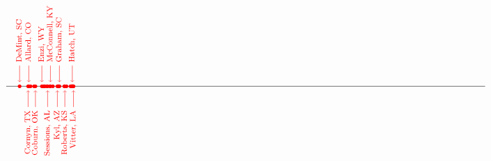 \begin{equation*}
  \def\dataD#1#2#3#4#5#6#7{\fill[dem](#5,0) circle (0.09);}
  \def\dataR#1#2#3#4#5#6#7{\fill[rep](#5,0) circle (0.09);}
  \def\dataDx#1#2#3#4#5#6#7{\fill[dem](#5,0) circle (0.09);
    \draw[dem,->,shorten >=0.15cm](#5,0) +(#7,1) node[above] {\rotatebox{90}{\footnotesize #1, #4}} -- +(0,0);}
  \def\dataRx#1#2#3#4#5#6#7{\fill[rep](#5,0) circle (0.09);
    \draw[rep,->,shorten >=0.15cm](#5,0) +(#7,1) node[above] {\rotatebox{90}{\footnotesize #1, #4}} -- +(0,0);}
  \def\dataDy#1#2#3#4#5#6#7{\fill[dem](#5,0) circle (0.09);
    \draw[dem,->,shorten >=0.15cm](#5,0) +(#7,-1) node[below] {\rotatebox{90}{\footnotesize #1, #4}} -- +(0,0);}
  \def\dataRy#1#2#3#4#5#6#7{\fill[rep](#5,0) circle (0.09);
    \draw[rep,->,shorten >=0.15cm](#5,0) +(#7,-1) node[below] {\rotatebox{90}{\footnotesize #1, #4}} -- +(0,0);}
  \begin{tikzpicture}[scale=0.75]
    \draw (-12.5,0) -- (10.5,0);
    \dataRx{DeMint}{James}{R}{SC}{-11.856041}{4.315015}{0}
    \dataRy{Cornyn}{John}{R}{TX}{-11.446925}{1.720794}{0}
    \dataRx{Allard}{A.}{R}{CO}{-11.414729}{2.353678}{0}
    \dataR{Ensign}{John}{R}{NV}{-11.329050}{2.598885}{0}
    \dataR{Inhofe}{Jim}{R}{OK}{-11.161216}{4.313828}{0}
    \dataRy{Coburn}{Tom}{R}{OK}{-11.095925}{6.451745}{0}
    \dataRx{Enzi}{Michael}{R}{WY}{-10.786882}{0.794427}{0}
    \dataR{Burr}{Richard}{R}{NC}{-10.716488}{2.508468}{0}
    \dataR{Bunning}{Jim}{R}{KY}{-10.674428}{1.409311}{0}
    \dataR{Chambliss}{Saxby}{R}{GA}{-10.639465}{1.781387}{0}
    \dataR{Isakson}{Johnny}{R}{GA}{-10.548229}{0.724451}{0}
    \dataRy{Sessions}{Jeff}{R}{AL}{-10.510782}{1.437248}{0}
    \dataR{Gregg}{Judd}{R}{NH}{-10.399051}{1.990574}{0}
    \dataRx{McConnell}{Mitch}{R}{KY}{-10.375319}{-1.293286}{0}
    \dataR{Dole}{Elizabeth}{R}{NC}{-10.258572}{1.732827}{0}
    \dataRy{Kyl}{Jon}{R}{AZ}{-10.042393}{2.633156}{0}
    \dataR{Craig}{Larry}{R}{ID}{-9.996687}{-0.803843}{0}
    \dataR{Crapo}{Mike}{R}{ID}{-9.987981}{-0.982945}{0}
    \dataRx{Graham}{Lindsey}{R}{SC}{-9.942743}{2.090629}{0}
    \dataR{Sununu}{John}{R}{NH}{-9.713036}{1.627775}{0}
    \dataRy{Roberts}{Pat}{R}{KS}{-9.682832}{-1.781188}{0}
    \dataR{Martinez}{Mel}{R}{FL}{-9.602384}{1.021259}{0}
    \dataR{Thune}{John}{R}{SD}{-9.412180}{0.719407}{0}
    \dataR{Hutchison}{Kay}{R}{TX}{-9.362272}{-0.132493}{0}
    \dataR{Lott}{Trent}{R}{MS}{-9.333867}{-1.703358}{0}
    \dataRx{Hatch}{Orrin}{R}{UT}{-9.325404}{-1.647643}{0}
    \dataR{Corker}{Bob}{R}{TN}{-9.321180}{1.242018}{0}
    \dataR{Grassley}{Charles}{R}{IA}{-9.274839}{1.535256}{0}
    \dataRy{Vitter}{David}{R}{LA}{-9.268543}{3.508303}{0}

\end{tikzpicture}
\end{equation*}
